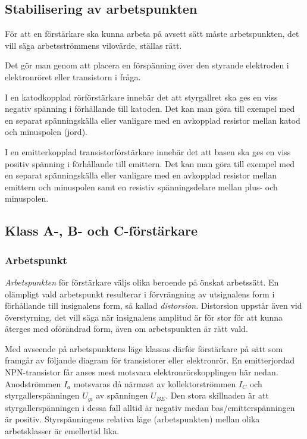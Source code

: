 \subsection{Stabilisering av arbetspunkten}

För att en förstärkare ska kunna arbeta på avsett sätt måste
arbetspunkten, det vill säga arbetsströmmens vilovärde, ställas rätt.

Det gör man genom att placera en förspänning över den styrande
elektroden i elektronröret eller transistorn i fråga.

I en katodkopplad rörförstärkare innebär det att styrgallret ska
ges en viss negativ spänning i förhållande till katoden.
Det kan man göra till exempel med en separat spänningskälla eller vanligare med
en avkopplad resistor mellan katod och minuspolen (jord).

I en emitterkopplad transistorförstärkare innebär det att basen ska
ges en viss positiv spänning i förhållande till emittern.
Det kan man göra till exempel med en separat spänningskälla eller vanligare med
en avkopplad resistor mellan emittern och minuspolen samt en resistiv
spänningsdelare mellan plus- och minuspolen.

\subsection{Klass A-, B- och C-förstärkare}

\subsubsection{Arbetspunkt}

\emph{Arbetspunkten} för förstärkare väljs olika beroende på önskat arbetssätt.
En olämpligt vald arbetspunkt resulterar i förvrängning av utsignalens form i
förhållande till insignalens form, så kallad \emph{distorsion}.
Distorsion uppstår även vid överstyrning, det vill säga när insignalens
amplitud är för stor för att kunna återges med oförändrad form, även om
arbetspunkten är rätt vald.

Med avseende på arbetspunktens läge klassas därför förstärkare på sätt
som framgår av följande diagram för transistorer eller elektronrör.
En emitterjordad NPN-transistor får anses mest motsvara
elektronrörskopplingen här nedan.
Anodströmmen \(I_a\) motsvaras då närmast av kollektorströmmen
\(I_C\) och styrgallerspänningen \(U_{gi}\) av spänningen
\(U_{BE}\).
Den stora skillnaden är att styrgallerspänningen i dessa
fall alltid är negativ medan bas/emitterspänningen är positiv.
Styrspänningens relativa läge (arbetspunkten) mellan olika
arbetsklasser är emellertid lika.

